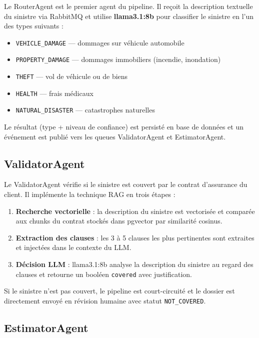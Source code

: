 Le RouterAgent est le premier agent du pipeline. Il reçoit la description textuelle
du sinistre via RabbitMQ et utilise \textbf{llama3.1:8b} pour classifier le sinistre
en l'un des types suivants :

\begin{itemize}
  \item \texttt{VEHICLE\_DAMAGE} — dommages sur véhicule automobile
  \item \texttt{PROPERTY\_DAMAGE} — dommages immobiliers (incendie, inondation)
  \item \texttt{THEFT} — vol de véhicule ou de biens
  \item \texttt{HEALTH} — frais médicaux
  \item \texttt{NATURAL\_DISASTER} — catastrophes naturelles
\end{itemize}

Le résultat (type + niveau de confiance) est persisté en base de données et
un événement est publié vers les queues ValidatorAgent et EstimatorAgent.

\subsection{ValidatorAgent}

Le ValidatorAgent vérifie si le sinistre est couvert par le contrat d'assurance
du client. Il implémente la technique RAG en trois étapes :

\begin{enumerate}
  \item \textbf{Recherche vectorielle} : la description du sinistre est vectorisée
        et comparée aux chunks du contrat stockés dans pgvector par similarité cosinus.
  \item \textbf{Extraction des clauses} : les 3 à 5 clauses les plus pertinentes
        sont extraites et injectées dans le contexte du LLM.
  \item \textbf{Décision LLM} : llama3.1:8b analyse la description du sinistre
        au regard des clauses et retourne un booléen \texttt{covered} avec justification.
\end{enumerate}

Si le sinistre n'est pas couvert, le pipeline est court-circuité et le dossier
est directement envoyé en révision humaine avec statut \texttt{NOT\_COVERED}.

\subsection{EstimatorAgent}

